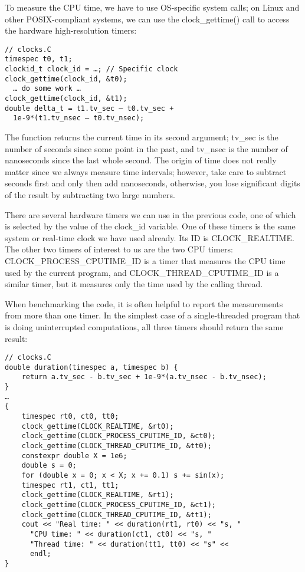 
To measure the CPU time, we have to use OS-specific system calls; on Linux and other POSIX-compliant systems, we can use the clock\_gettime() call to access the hardware high-resolution timers:

\begin{lstlisting}[style=styleCXX]
// clocks.C
timespec t0, t1;
clockid_t clock_id = …; // Specific clock
clock_gettime(clock_id, &t0);
  … do some work …
clock_gettime(clock_id, &t1);
double delta_t = t1.tv_sec – t0.tv_sec +
  1e-9*(t1.tv_nsec – t0.tv_nsec);
\end{lstlisting}

The function returns the current time in its second argument; tv\_sec is the number of seconds since some point in the past, and tv\_nsec is the number of nanoseconds since the last whole second. The origin of time does not really matter since we always measure time intervals; however, take care to subtract seconds first and only then add nanoseconds, otherwise, you lose significant digits of the result by subtracting two large numbers.

There are several hardware timers we can use in the previous code, one of which is selected by the value of the clock\_id variable. One of these timers is the same system or real-time clock we have used already. Its ID is CLOCK\_REALTIME. The other two timers of interest to us are the two CPU timers: CLOCK\_PROCESS\_CPUTIME\_ID is a timer that measures the CPU time used by the current program, and CLOCK\_THREAD\_CPUTIME\_ID is a similar timer, but it measures only the time used by the calling thread.

When benchmarking the code, it is often helpful to report the measurements from more than one timer. In the simplest case of a single-threaded program that is doing uninterrupted computations, all three timers should return the same result:

\begin{lstlisting}[style=styleCXX]
// clocks.C
double duration(timespec a, timespec b) {
	return a.tv_sec - b.tv_sec + 1e-9*(a.tv_nsec - b.tv_nsec);
}
…
{
	timespec rt0, ct0, tt0;
	clock_gettime(CLOCK_REALTIME, &rt0);
	clock_gettime(CLOCK_PROCESS_CPUTIME_ID, &ct0);
	clock_gettime(CLOCK_THREAD_CPUTIME_ID, &tt0);
	constexpr double X = 1e6;
	double s = 0;
	for (double x = 0; x < X; x += 0.1) s += sin(x);
	timespec rt1, ct1, tt1;
	clock_gettime(CLOCK_REALTIME, &rt1);
	clock_gettime(CLOCK_PROCESS_CPUTIME_ID, &ct1);
	clock_gettime(CLOCK_THREAD_CPUTIME_ID, &tt1);
	cout << "Real time: " << duration(rt1, rt0) << "s, "
	  "CPU time: " << duration(ct1, ct0) << "s, "
	  "Thread time: " << duration(tt1, tt0) << "s" <<
	  endl;
}
\end{lstlisting}

